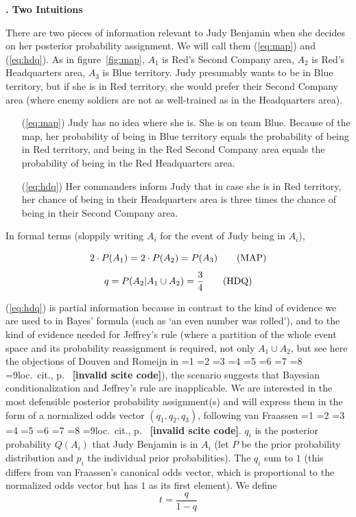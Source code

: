 \documentclass[12pt]{article}
\newcommand{\kapt}[1]{\noindent \textbf{{\thechap}. #1}\addtocounter{chap}{1}}
\newcommand{\qnull}[1]{`#1'}
\newif\ifNumericalOrYear
\newcommand{\PageP}{p.~}
\newcommand{\PageP}{}
\newcommand{\nias}{\noindent} %
\newcommand{\nial}{\noindent} %
\newcommand{\scite}[3]{\ifnum#1=1\ifNumericalOrYear\citep{#2}\else\citeyearpar{#2}\fi\else
\ifnum#1=2\ifNumericalOrYear\citep[#3]{#2}\else\citep[{\PageP}#3]{#2}\fi\else
\ifnum#1=3\ifNumericalOrYear(\citet[#3]{#2})\else\citep[{\PageP}#3]{#2}\fi\else
\ifnum#1=4\ifNumericalOrYear\citet{#2}\else\citet{#2}\fi\else
\ifnum#1=5\ifNumericalOrYear(\citet{#2})\else\citep{#2}\fi\else
\ifnum#1=6\ifNumericalOrYear(\citet[#3]{#2})\else\citep[{\PageP}#3]{#2}\fi\else
\ifnum#1=7\ifNumericalOrYear\citep{#2}\else\citealp{#2}\fi\else
\ifnum#1=8\ifNumericalOrYear\citep[#3]{#2}\else\citealp[{\PageP}#3]{#2}\fi\else
\ifnum#1=9\ifNumericalOrYear\citep[#3]{#2}\else{}loc.\ cit., {\PageP}#3\fi\else
\textbf{[invalid scite code]}\fi\fi\fi\fi\fi\fi\fi\fi\fi}
\begin{document}
\medskip

\kapt{Two Intuitions}

\nias There are two pieces of information relevant to Judy Benjamin
when she decides on her posterior probability assignment. We will call
them ({\ref{eq:map}}) and ({\ref{eq:hdq}}). As in
figure~\ref{fig:map}, $A_{1}$ is Red's Second Company area, $A_{2}$ is
Red's Headquarters area, $A_{3}$ is Blue territory. Judy presumably
wants to be in Blue territory, but if she is in Red territory, she
would prefer their Second Company area (where enemy soldiers are not
as well-trained as in the Headquarters area).

\begin{enumerate}
\item[({\ref{eq:map}})] Judy has no idea where she is. She is on team Blue.
  Because of the map, her probability of being in Blue territory
  equals the probability of being in Red territory, and being in the Red
  Second Company area equals the probability of being in the Red
  Headquarters area.
\item[({\ref{eq:hdq}})] Her commanders inform Judy that in case she is in Red
  territory, her chance of being in their Headquarters area is three
  times the chance of being in their Second Company area.
\end{enumerate}

\nial In formal terms (sloppily writing $A_{i}$ for the event of Judy
being in $A_{i}$),

\begin{equation}
  \label{eq:map}
  2\cdot{}P(A_{1})=2\cdot{}P(A_{2})=P(A_{3})\tag{\mbox{MAP}}
\end{equation}
\begin{equation}
  \label{eq:hdq}
  q=P(A_{2}|A_{1}\cup{}A_{2})=\frac{3}{4}\tag{\mbox{HDQ}}
\end{equation}

\nial ({\ref{eq:hdq}}) is partial information because in contrast to
the kind of evidence we are used to in Bayes' formula (such as
\qnull{an even number was rolled}), and to the kind of evidence needed
for Jeffrey's rule (where a partition of the whole event space and its
probability reassignment is required, not only $A_{1}\cup{}A_{2}$, but
see here the objections of Douven and Romeijn in
\scite{7}{douvenromeijn09}{}), the scenario suggests that Bayesian
conditionalization and Jeffrey's rule are inapplicable. We are
interested in the most defensible posterior probability assignment(s)
and will express them in the form of a normalized odds vector
$(q_{1},q_{2},q_{3})$, following van Fraassen \scite{1}{fraassen81}{}.
$q_{i}$ is the posterior probability $Q(A_{i})$ that Judy Benjamin is
in $A_{i}$ (let $P$ be the prior probability distribution and $p_{i}$
the individual prior probabilities). The $q_{i}$ sum to $1$ (this
differs from van Fraassen's canonical odds vector, which is
proportional to the normalized odds vector but has $1$ as its first
element). We define
\begin{displaymath}
  t=\frac{q}{1-q}
\end{displaymath}
\end{document}

